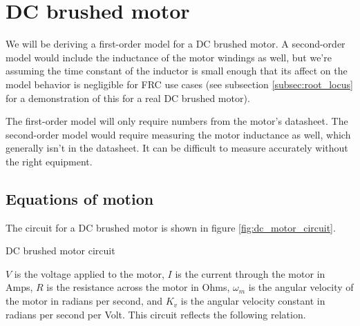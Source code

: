 \section{DC brushed motor}
\label{sec:dc_brushed_motor}

We will be deriving a first-order \gls{model} for a DC brushed motor. A
second-order \gls{model} would include the inductance of the motor windings as
well, but we're assuming the time constant of the inductor is small enough that
its affect on the \gls{model} behavior is negligible for FRC use cases (see
subsection \ref{subsec:root_locus} for a demonstration of this for a real DC
brushed motor).

The first-order \gls{model} will only require numbers from the motor's
datasheet. The second-order \gls{model} would require measuring the motor
inductance as well, which generally isn't in the datasheet. It can be difficult
to measure accurately without the right equipment.

\subsection{Equations of motion}

The circuit for a DC brushed motor is shown in figure
\ref{fig:dc_motor_circuit}.

\begin{bookfigure}

  \caption{DC brushed motor circuit}
  \label{fig:dc_motor_circuit}
\end{bookfigure}

$V$ is the voltage applied to the motor, $I$ is the current through the motor in
Amps, $R$ is the resistance across the motor in Ohms, $\omega_m$ is the angular
velocity of the motor in radians per second, and $K_v$ is the angular velocity
constant in radians per second per Volt. This circuit reflects the following
relation.

